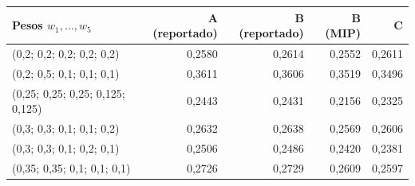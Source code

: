 \begin{tabular}{lrrrr}
\toprule
Pesos $w_1,\ldots,w_5$ & A (reportado) & B (reportado) & B (MIP) & C \\
\midrule
(0,2; 0,2; 0,2; 0,2; 0,2) & 0,2580 & 0,2614 & 0,2552 & 0,2611 \\
(0,2; 0,5; 0,1; 0,1; 0,1) & 0,3611 & 0,3606 & 0,3519 & 0,3496 \\
(0,25; 0,25; 0,25; 0,125; 0,125) & 0,2443 & 0,2431 & 0,2156 & 0,2325 \\
(0,3; 0,3; 0,1; 0,1; 0,2) & 0,2632 & 0,2638 & 0,2569 & 0,2606 \\
(0,3; 0,3; 0,1; 0,2; 0,1) & 0,2506 & 0,2486 & 0,2420 & 0,2381 \\
(0,35; 0,35; 0,1; 0,1; 0,1) & 0,2726 & 0,2729 & 0,2609 & 0,2597 \\
\bottomrule
\end{tabular}
